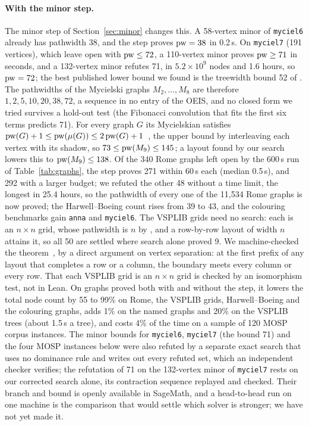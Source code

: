 \paragraph{With the minor step.} The minor step of Section~\ref{sec:minor}
changes this. A 58-vertex minor of \texttt{myciel6} already has pathwidth 38,
and the step proves $\mathrm{pw}=38$ in 0.2\,s. On \texttt{myciel7} (191 vertices),
which \citet{CoudertMazauricNisse2016} leave open with $\mathrm{pw}\le72$, a
110-vertex minor proves $\mathrm{pw}\ge71$ in seconds, and a 132-vertex minor refutes
71, in $5.2\times10^{9}$ nodes and 1.6 hours, so $\mathrm{pw}=72$; the best published
lower bound we found is the treewidth bound 52 of
\citet{BodlaenderWolleKoster2006}. The pathwidths of the Mycielski graphs
$M_2,\dots,M_8$ are therefore $1, 2, 5, 10, 20, 38, 72$, a sequence in no
entry of the OEIS, and no closed form we tried survives a hold-out test (the
Fibonacci convolution that fits the first six terms predicts 71). For every
graph $G$ its Mycielskian satisfies
$\mathrm{pw}(G)+1\le\mathrm{pw}(\mu(G))\le2\,\mathrm{pw}(G)+1$~, the upper bound by
interleaving each vertex with its shadow, so $73\le\mathrm{pw}(M_9)\le145$; a layout found by our search lowers this to $\mathrm{pw}(M_9)\le138$. Of the 340 Rome graphs left open by the 600\,s run of
Table~\ref{tab:graphs}, the step proves 271 within 60\,s each (median 0.5\,s),
and 292 with a larger budget; we refuted the other 48 without a time limit,
the longest in 25.4 hours, so the pathwidth of every one of the 11,534 Rome
graphs is now proved;
the Harwell--Boeing count rises from 39 to 43, and the colouring benchmarks
gain \texttt{anna} and \texttt{myciel6}. The VSPLIB grids need no search: each
is an $n\times n$ grid, whose pathwidth is $n$ by
\citet[Theorem~4.1]{EllisWarren2008}, and a row-by-row layout of width $n$ attains it, so all 50 are settled where
search alone proved 9. We machine-checked the theorem~, by a
direct argument on vertex separation: at the first prefix of any layout that
completes a row or a column, the boundary meets every column or every row.
That each VSPLIB grid is an $n\times n$ grid is checked by an isomorphism
test, not in Lean. On graphs proved both with and without
the step, it lowers the total node count by 55 to 99\% on Rome, the VSPLIB grids,
Harwell--Boeing and the colouring graphs, adds 1\% on the named graphs and
20\% on the VSPLIB trees (about 1.5\,s a tree), and costs 4\% of the time on
a sample of 120 MOSP corpus instances. The minor bounds for \texttt{myciel6},
\texttt{myciel7} (the bound 71) and the four MOSP instances below were also refuted by a
separate exact search that uses no dominance rule and writes out every refuted
set, which an independent checker verifies; the refutation of 71 on the
132-vertex minor of \texttt{myciel7} rests on our corrected search alone, its
contraction sequence replayed and checked. Their branch and bound is openly available in SageMath, and a
head-to-head run on one machine is the comparison that would settle which solver is stronger; we have not yet made it.

